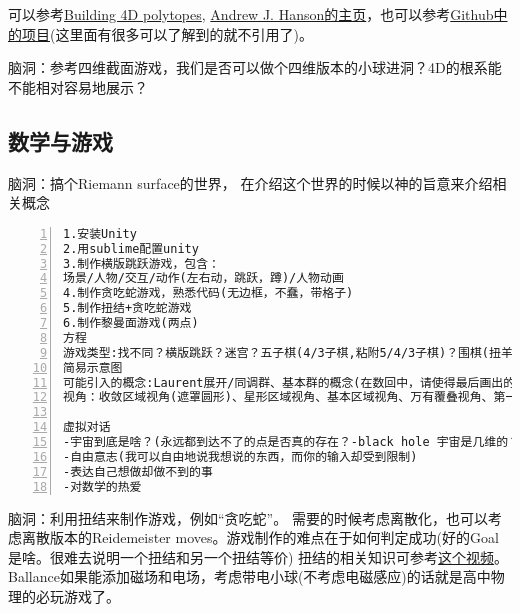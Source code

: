 \documentclass[11pt]{amsart}
\begin{document}
可以参考\href{https://syntopia.github.io/Polytopia/polytopes.html}{Building 4D polytopes}, \href{https://legacy.cs.indiana.edu/~hansona/}{Andrew J. Hanson的主页}，也可以参考\href{https://github.com/wxyhly/4dViewer}{Github中的项目}(这里面有很多可以了解到的就不引用了)。

脑洞：参考四维截面游戏，我们是否可以做个四维版本的小球进洞？4D的根系能不能相对容易地展示？

\subsection{数学与游戏}


脑洞：搞个Riemann surface的世界， 在介绍这个世界的时候以神的旨意来介绍相关概念
\begin{lstlisting}[numbers=left,numberstyle=\tiny,numbersep=10pt]
1.安装Unity
2.用sublime配置unity
3.制作横版跳跃游戏，包含：
场景/人物/交互/动作(左右动，跳跃，蹲)/人物动画
4.制作贪吃蛇游戏，熟悉代码(无边框，不蠢，带格子)
5.制作扭结+贪吃蛇游戏
6.制作黎曼面游戏(两点)
方程
游戏类型:找不同？横版跳跃？迷宫？五子棋(4/3子棋,粘附5/4/3子棋)？围棋(扭羊头游戏)?跳棋？空间爬行？扭结+贪吃蛇？塔防？数独？数回？华容道？ORBOX B?(这玩意可以做成三维版本!4维就有点难了)(mini metro？连连看？泡泡龙？消砖块？2048？推箱子？其他的Nikoli Puzzles？)
简易示意图
可能引入的概念:Laurent展开/同调群、基本群的概念(在数回中，请使得最后画出的曲线表示基本群不平凡但是同调群不平凡)/覆叠，万有覆叠，deck transformation(华容道简化难度:允许deck transformation将区块变换至另一个基本区域中相同的位置；或者，我们允许上下粘接)/曲率/曲率驱动游戏/descent(数独解何时能成为更小的黎曼面的解)
视角：收敛区域视角(遮罩圆形)、星形区域视角、基本区域视角、万有覆叠视角、第一人称视角、二维3D视角(视角需要通过"培训+考试"解锁)

虚拟对话
-宇宙到底是啥？(永远都到达不了的点是否真的存在？-black hole 宇宙是几维的？2+3(颜色)+1(时间) 如何测量时间，or时间的流逝是否是均匀的？)
-自由意志(我可以自由地说我想说的东西，而你的输入却受到限制)
-表达自己想做却做不到的事
-对数学的热爱

\end{lstlisting}

脑洞：利用扭结来制作游戏，例如“贪吃蛇”。 需要的时候考虑离散化，也可以考虑离散版本的Reidemeister moves。游戏制作的难点在于如何判定成功(好的Goal是啥。很难去说明一个扭结和另一个扭结等价)
扭结的相关知识可参考\href{https://www.youtube.com/watch?v=nYz3pRk1cCA}{这个视频}。Ballance如果能添加磁场和电场，考虑带电小球(不考虑电磁感应)的话就是高中物理的必玩游戏了。
\end{document}
